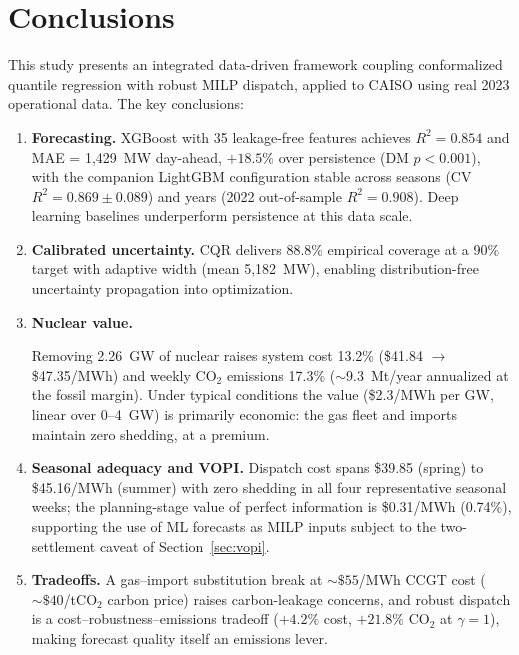 \documentclass[preprint,12pt,authoryear]{elsarticle}
\begin{document}
\section{Conclusions}
\label{sec:conclusion}

This study presents an integrated data-driven framework coupling conformalized quantile regression with robust MILP dispatch, applied to CAISO using real 2023 operational data. The key conclusions:

\begin{enumerate}
    \item \textbf{Forecasting.} XGBoost with 35 leakage-free features achieves $R^2 = 0.854$ and MAE = 1{,}429~MW day-ahead, $+18.5\%$ over persistence (DM $p < 0.001$), with the companion LightGBM configuration stable across seasons (CV $R^2 = 0.869 \pm 0.089$) and years (2022 out-of-sample $R^2 = 0.908$). Deep learning baselines underperform persistence at this data scale.

    \item \textbf{Calibrated uncertainty.} CQR delivers 88.8\% empirical coverage at a 90\% target with adaptive width (mean 5{,}182~MW), enabling distribution-free uncertainty propagation into optimization.

    \item \textbf{Nuclear value.} {\sloppy Removing 2.26~GW of nuclear raises system cost 13.2\% (\$41.84 $\to$ \$47.35/MWh) and weekly CO$_2$ emissions 17.3\% (${\sim}9.3$~Mt/year annualized at the fossil margin). Under typical conditions the value (\$2.3/MWh per GW, linear over 0--4~GW) is primarily economic: the gas fleet and imports maintain zero shedding, at a premium.\par}

    \item \textbf{Seasonal adequacy and VOPI.} Dispatch cost spans \$39.85 (spring) to \$45.16/MWh (summer) with zero shedding in all four representative seasonal weeks; the planning-stage value of perfect information is \$0.31/MWh (0.74\%), supporting the use of ML forecasts as MILP inputs subject to the two-settlement caveat of Section~\ref{sec:vopi}.

    \item \textbf{Tradeoffs.} A gas--import substitution break at ${\sim}\$55$/MWh CCGT cost (${\sim}\$40$/tCO$_2$ carbon price) raises carbon-leakage concerns, and robust dispatch is a cost--robustness--emissions tradeoff ($+4.2\%$ cost, $+21.8\%$ CO$_2$ at $\gamma{=}1$), making forecast quality itself an emissions lever.


\end{enumerate}
\end{document}
